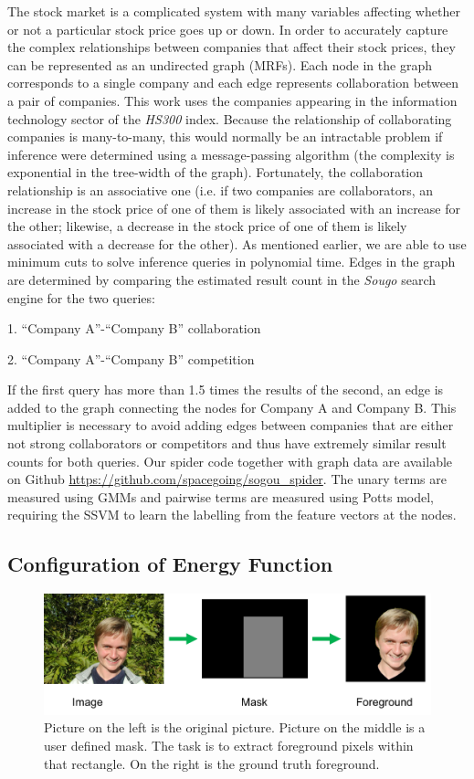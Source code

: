 The stock market is a complicated system with many variables
affecting whether or not a particular stock price goes up or
down. In order to accurately capture the complex relationships
between companies that affect their stock prices, they can be
represented as an undirected graph (MRFs). Each node in the graph
corresponds to a single company and each edge represents
collaboration between a pair of companies. This work uses the
companies appearing in the information technology sector of the
\emph{ HS300 } index. Because the relationship of collaborating
companies is many-to-many, this would normally be an intractable
problem if inference were determined using a message-passing
algorithm (the complexity is exponential in the tree-width of the
graph). Fortunately, the collaboration relationship is an
associative one (i.e. if two companies are collaborators, an
increase in the stock price of one of them is likely associated
with an increase for the other; likewise, a decrease in the stock
price of one of them is likely associated with a decrease for the
other). As mentioned earlier, we are able to use minimum cuts to
solve inference queries in polynomial time. Edges in the graph
are determined by comparing the estimated result count in the
\emph{ Sougo } search engine for the two queries:

1.  “Company A”-“Company B” collaboration

2.  “Company A”-“Company B” competition

If the first query has more than 1.5 times the results of the
second, an edge is added to the graph connecting the nodes for
Company A and Company B. This multiplier is necessary to avoid
adding edges between companies that are either not strong
collaborators or competitors and thus have extremely similar
result counts for both queries. Our spider code together with
graph data are available on Github
\url{https://github.com/spacegoing/sogou_spider}. The unary terms are
measured using GMMs and pairwise terms are measured using Potts
model, requiring the SSVM to learn the labelling from the feature
vectors at the nodes.

\subsection{Configuration of Energy Function}
\label{sec:grabcut}

\begin{figure}[b]
  \centering
  \includegraphics[width=1\linewidth]{RelatedWorks/figures/grabcut_task.png}
  \caption{\label{fig:grabcut_example} Picture on the left is
    the original picture. Picture
    on the middle is a user defined mask. The task is to extract
    foreground pixels within that rectangle. On the right is the
    ground truth foreground.}
\end{figure}

